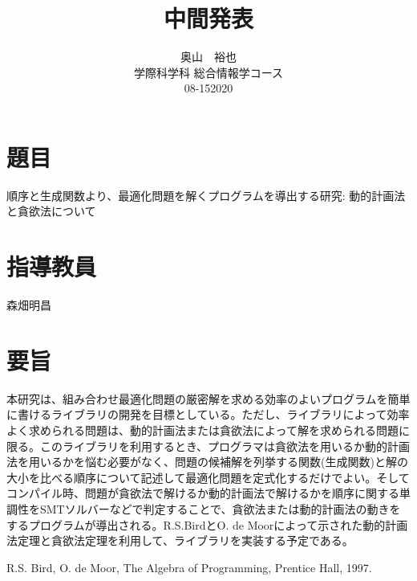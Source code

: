 \documentclass[11pt,a4paper]{jarticle}
\title{中間発表}
\author{奥山　裕也\\
        学際科学科 総合情報学コース\\
        08-152020\\
       }
\date{}
\begin{document}
\maketitle
\section*{題目}
順序と生成関数より、最適化問題を解くプログラムを導出する研究:
動的計画法と貪欲法について
\section*{指導教員}
森畑明昌
\section*{要旨}
本研究は、組み合わせ最適化問題の厳密解を求める効率のよいプログラムを簡単に書けるライブラリの開発を目標としている。ただし、ライブラリによって効率よく求められる問題は、動的計画法または貪欲法によって解を求められる問題に限る。このライブラリを利用するとき、プログラマは貪欲法を用いるか動的計画法を用いるかを悩む必要がなく、問題の候補解を列挙する関数(生成関数)と解の大小を比べる順序について記述して最適化問題を定式化するだけでよい。そしてコンパイル時、問題が貪欲法で解けるか動的計画法で解けるかを順序に関する単調性をSMTソルバーなどで判定することで、貪欲法または動的計画法の動きをするプログラムが導出される。R.S.BirdとO. de Moor\cite{aop}によって示された動的計画法定理と貪欲法定理を利用して、ライブラリを実装する予定である。
\begin{thebibliography}{9}
 R.S. Bird, O. de Moor, The Algebra of Programming, Prentice Hall, 1997.
\end{thebibliography}
\end{document}

